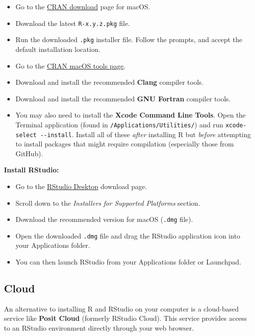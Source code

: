 \documentclass[
]{book}
\providecommand{\tightlist}{%
  \setlength{\itemsep}{0pt}\setlength{\parskip}{0pt}}
\begin{document}
\begin{itemize}
\tightlist
\item
  Go to the \href{https://cran.r-project.org/}{CRAN download} page for macOS.
\item
  Download the latest \texttt{R-x.y.z.pkg} file.
\item
  Run the downloaded \texttt{.pkg} installer file. Follow the prompts, and accept the default installation location.
\item
  Go to the \href{https://cran.r-project.org/bin/macosx/tools/}{CRAN macOS tools page}.
\item
  Download and install the recommended \textbf{Clang} compiler tools.
\item
  Download and install the recommended \textbf{GNU Fortran} compiler tools.
\item
  You may also need to install the \textbf{Xcode Command Line Tools}. Open the Terminal application (found in \texttt{/Applications/Utilities/}) and run \texttt{xcode-select\ -\/-install}. Install all of these \emph{after} installing R but \emph{before} attempting to install packages that might require compilation (especially those from GitHub).
\end{itemize}

\textbf{Install RStudio:}

\begin{itemize}
\tightlist
\item
  Go to the \href{https://posit.co/download/rstudio-desktop/}{RStudio Desktop} download page.
\item
  Scroll down to the \emph{Installers for Supported Platforms} section.
\item
  Download the recommended version for macOS (\texttt{.dmg} file).
\item
  Open the downloaded \texttt{.dmg} file and drag the RStudio application icon into your Applications folder.
\item
  You can then launch RStudio from your Applications folder or Launchpad.
\end{itemize}

\subsection{Cloud}\label{cloud}

An alternative to installing R and RStudio on your computer is a cloud-based service like \textbf{Posit Cloud} (formerly RStudio Cloud). This service provides access to an RStudio environment directly through your web browser.
\end{document}
